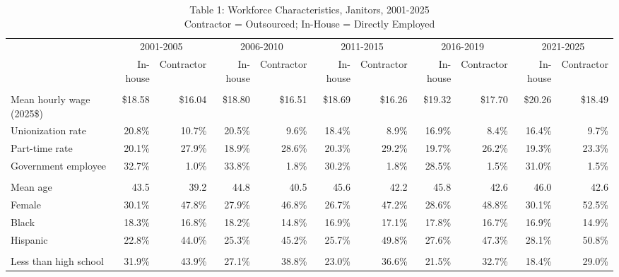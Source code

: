 \begin{table}[!t]
\caption*{
{\large Table 1: Workforce Characteristics, Janitors, 2001-2025} \\
{\small Contractor = Outsourced; In-House = Directly Employed}
} 

\fontsize{10.0pt}{12.0pt}\selectfont

\centering\begin{tabular}{l|rrrrrrrrrr}
\toprule
  & \multicolumn{2}{c}{2001-2005} & \multicolumn{2}{c}{2006-2010} & \multicolumn{2}{c}{2011-2015} & \multicolumn{2}{c}{2016-2019} & \multicolumn{2}{c}{2021-2025} \\ 
\cmidrule(lr){2-3} \cmidrule(lr){4-5} \cmidrule(lr){6-7} \cmidrule(lr){8-9} \cmidrule(lr){10-11}
  & In-house & Contractor & In-house & Contractor & In-house & Contractor & In-house & Contractor & In-house & Contractor \\ 
\midrule\addlinespace[2.5pt]
\multicolumn{11}{l}{Employment and wages} \\[2.5pt] 
\midrule\addlinespace[2.5pt]
Mean hourly wage (2025\$) & \$18.58 & \$16.04 & \$18.80 & \$16.51 & \$18.69 & \$16.26 & \$19.32 & \$17.70 & \$20.26 & \$18.49 \\
Unionization rate & 20.8\% & 10.7\% & 20.5\% & 9.6\% & 18.4\% & 8.9\% & 16.9\% & 8.4\% & 16.4\% & 9.7\% \\
Part-time rate & 20.1\% & 27.9\% & 18.9\% & 28.6\% & 20.3\% & 29.2\% & 19.7\% & 26.2\% & 19.3\% & 23.3\% \\
Government employee & 32.7\% & 1.0\% & 33.8\% & 1.8\% & 30.2\% & 1.8\% & 28.5\% & 1.5\% & 31.0\% & 1.5\% \\
\midrule\addlinespace[2.5pt]
\multicolumn{11}{l}{Demographics} \\[2.5pt] 
\midrule\addlinespace[2.5pt]
Mean age & 43.5 & 39.2 & 44.8 & 40.5 & 45.6 & 42.2 & 45.8 & 42.6 & 46.0 & 42.6 \\
Female & 30.1\% & 47.8\% & 27.9\% & 46.8\% & 26.7\% & 47.2\% & 28.6\% & 48.8\% & 30.1\% & 52.5\% \\
Black & 18.3\% & 16.8\% & 18.2\% & 14.8\% & 16.9\% & 17.1\% & 17.8\% & 16.7\% & 16.9\% & 14.9\% \\
Hispanic & 22.8\% & 44.0\% & 25.3\% & 45.2\% & 25.7\% & 49.8\% & 27.6\% & 47.3\% & 28.1\% & 50.8\% \\
\midrule\addlinespace[2.5pt]
\multicolumn{11}{l}{Education} \\[2.5pt] 
\midrule\addlinespace[2.5pt]
Less than high school & 31.9\% & 43.9\% & 27.1\% & 38.8\% & 23.0\% & 36.6\% & 21.5\% & 32.7\% & 18.4\% & 29.0\% \\

\end{tabular}
\end{table}
